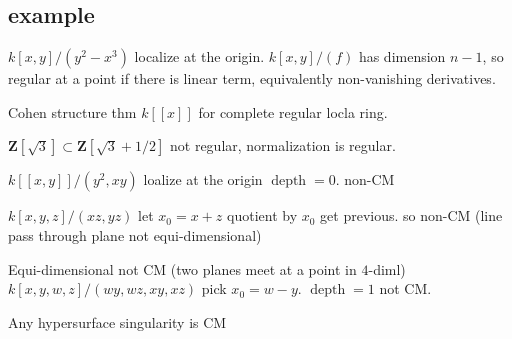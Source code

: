 \documentclass[leqno]{amsart}
\newcommand{\Z}{{\mathbf{Z}}}
\DeclareMathOperator{\depth}{depth}
\newcommand{\1}{\mathbf{1}}
\theoremstyle{definition}
\theoremstyle{remark}
\begin{document}
\subsection{example}

$k[x,y]/(y^2-x^3)$ localize at the origin.
$k[x,y]/(f)$ has dimension  $n-1$,
so regular at a point 
if there is linear term,
equivalently non-vanishing derivatives.

Cohen structure thm
$k[[x]]$ for complete regular locla ring.

$\Z[\sqrt{3}]\subset \Z[\sqrt{3}+1/2]$
not regular, normalization is regular.

$k[[x,y]]/(y^2,xy)$ loalize at the origin
 $\depth=0$. non-CM

 $k[x,y,z]/(xz,yz)$ let $x_0=x+z$
 quotient by  $x_0$ get previous.
 so non-CM
 (line pass through plane not equi-dimensional)

 Equi-dimensional not CM
 (two planes meet at a point in $4$-diml)
 $k[x,y,w,z]/(wy,wz,xy,xz)$
 pick  $x_0=w-y$.
  $\depth=1$ not CM.

Any hypersurface singularity is CM

%
%
\end{document}
